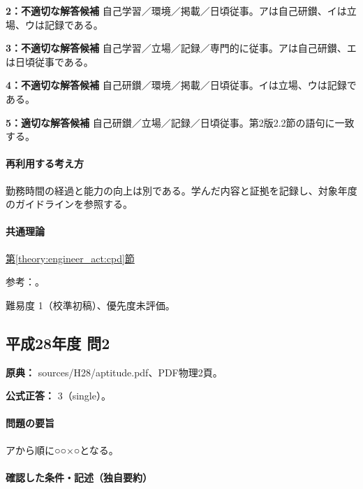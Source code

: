 \noindent\textbf{2：不適切な解答候補} 自己学習／環境／掲載／日頃従事。アは自己研鑚、イは立場、ウは記録である。\par

\noindent\textbf{3：不適切な解答候補} 自己学習／立場／記録／専門的に従事。アは自己研鑚、エは日頃従事である。\par

\noindent\textbf{4：不適切な解答候補} 自己研鑚／環境／掲載／日頃従事。イは立場、ウは記録である。\par

\noindent\textbf{5：適切な解答候補} 自己研鑚／立場／記録／日頃従事。第2版2.2節の語句に一致する。\par

\paragraph{再利用する考え方} 勤務時間の経過と能力の向上は別である。学んだ内容と証拠を記録し、対象年度のガイドラインを参照する。

\paragraph{共通理論} \hyperref[theory:engineer_act:cpd]{第\ref*{theory:engineer_act:cpd}節}

\par 参考：\cite{cpd_v2}。

\par 難易度 1（校準初稿）、優先度未評価。

\subsection{平成28年度 問2}
\label{q:h28-reg-apt-02}

\noindent\textbf{原典：} sources/H28/aptitude.pdf、PDF物理2頁。

\textbf{公式正答：} 3（single）。

\paragraph{問題の要旨} アから順に○○×○となる。

\paragraph{確認した条件・記述（独自要約）}\mbox{}\par

